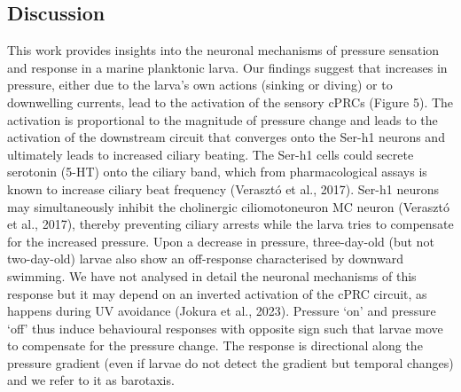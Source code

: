 \documentclass[
  11pt,
]{article}
\begin{document}
\subsection{Discussion}\label{discussion}

This work provides insights into the neuronal mechanisms of pressure
sensation and response in a marine planktonic larva. Our findings
suggest that increases in pressure, either due to the larva's own
actions (sinking or diving) or to downwelling currents, lead to the
activation of the sensory cPRCs (Figure 5). The activation is
proportional to the magnitude of pressure change and leads to the
activation of the downstream circuit that converges onto the Ser-h1
neurons and ultimately leads to increased ciliary beating. The Ser-h1
cells could secrete serotonin (5-HT) onto the ciliary band, which from
pharmacological assays is known to increase ciliary beat frequency
(Verasztó et al., 2017). Ser-h1 neurons may simultaneously inhibit the
cholinergic ciliomotoneuron MC neuron (Verasztó et al., 2017), thereby
preventing ciliary arrests while the larva tries to compensate for the
increased pressure. Upon a decrease in pressure, three-day-old (but not
two-day-old) larvae also show an off-response characterised by downward
swimming. We have not analysed in detail the neuronal mechanisms of this
response but it may depend on an inverted activation of the cPRC
circuit, as happens during UV avoidance (Jokura et al., 2023). Pressure
`on' and pressure `off' thus induce behavioural responses with opposite
sign such that larvae move to compensate for the pressure change. The
response is directional along the pressure gradient (even if larvae do
not detect the gradient but temporal changes) and we refer to it as
barotaxis.
\end{document}
